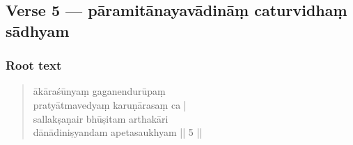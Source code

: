 \documentclass[12pt]{article}
\begin{document}
% 

\subsection{Verse 5 — pāramitānayavādināṃ caturvidhaṃ sādhyam}
\subsubsection{Root text}
\begin{quote}
	ākāraśūnyaṃ gaganendurūpaṃ \\
	pratyātmavedyaṃ karuṇārasaṃ ca |\\
	sallakṣaṇair bhūṣitam\footnoteB{
		bhūṣitam] \EDD ; bhuṣitam \MS
	} arthakāri \\
	dānādiniṣyandam apetasaukhyam || 5 ||
 
% 
\end{quote}
\end{document}
